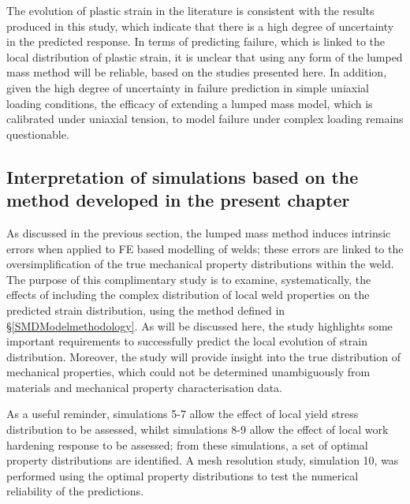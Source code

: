 The evolution of plastic strain in the literature is consistent with the results produced in this study, which indicate that there is a high degree of uncertainty in the predicted response. In terms of predicting failure, which is linked to the local distribution of plastic strain, it is unclear that using any form of the lumped mass method will be reliable, based on the studies presented here. In addition, given the high degree of uncertainty in failure prediction in simple uniaxial loading conditions, the efficacy of extending a lumped mass model, which is calibrated under uniaxial tension, to model failure under complex loading remains questionable. 

\subsection{Interpretation of simulations based on the method developed in the present chapter}
\label{SMDModellingstudyDiscussionPropertydistributions}
As discussed in the previous section, the lumped mass method induces intrinsic errors when applied to FE based modelling of welds; these errors are linked to the oversimplification of the true mechanical property distributions within the weld. The purpose of this complimentary study is to examine, systematically, the effects of including the complex distribution of local weld properties on the predicted strain distribution, using the method defined in \S\ref{SMDModelmethodology}. As will be discussed here, the study highlights some important requirements to successfully predict the local evolution of strain distribution. Moreover, the study will provide insight into the true distribution of mechanical properties, which could not be determined unambiguously from materials and mechanical property characterisation data. 

As a useful reminder, simulations 5-7 allow the effect of local yield stress distribution to be assessed, whilst simulations 8-9 allow the effect of local work hardening response to be assessed; from these simulations, a set of optimal property distributions are identified. A mesh resolution study, simulation 10, was performed using the optimal property distributions to test the numerical reliability of the predictions. 


